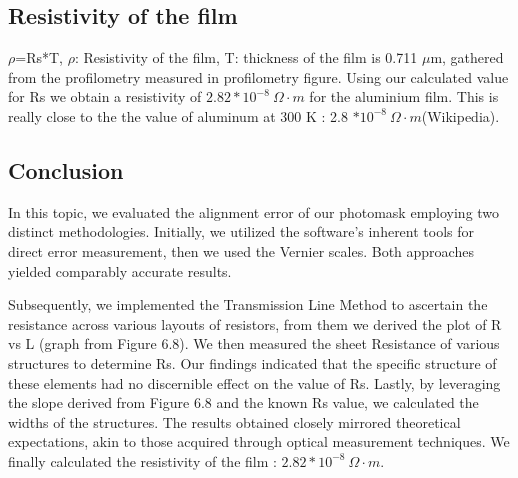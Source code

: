 \documentclass[a4paper, table]{article}
\begin{document}
\subsection*{Resistivity of the film}
$\rho$=Rs*T, $\rho$: Resistivity of the film, T: thickness of the film is 0.711 $\mu$m, gathered from the profilometry measured in profilometry figure. Using our calculated value for Rs we obtain a resistivity of $2.82 * 10^{-8} \ \Omega \cdot m$ for the aluminium film. This is really close to the the value of aluminum at 300 K : 2.8 $* 10^{-8} \ \Omega \cdot m$(Wikipedia).





\subsection{Conclusion}
In this topic, we evaluated the alignment error of our photomask employing two distinct methodologies. Initially, we utilized the software's inherent tools for direct error measurement, then we used the Vernier scales. Both approaches yielded comparably accurate results.

Subsequently, we implemented the Transmission Line Method to ascertain the resistance across various layouts of resistors, from them we derived the plot of R vs L (graph from Figure 6.8). We then measured the sheet Resistance of various structures to determine Rs. Our findings indicated that the specific structure of these elements had no discernible effect on the value of Rs.
Lastly, by leveraging the slope derived from Figure 6.8 and the known Rs value, we calculated the widths of the structures. The results obtained closely mirrored theoretical expectations, akin to those acquired through optical measurement techniques.
We finally calculated the resistivity of the film : $2.82 * 10^{-8} \ \Omega \cdot m$.
\newpage
\end{document}
